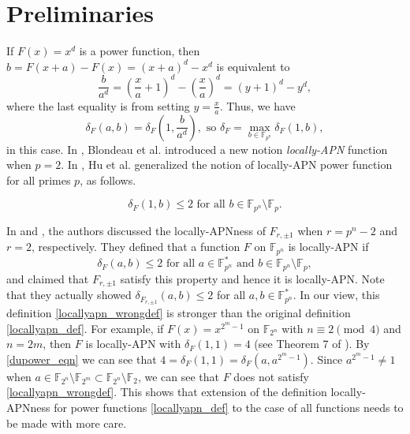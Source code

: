 \documentclass[11pt]{article}
\numberwithin{theorem}{section}
\newcommand{\Max}{\displaystyle \max}
\newcommand{\Frac}{\displaystyle \frac}
\newcommand{\F}{\mathbb F}
\newcommand{\Fbn}{\mathbb{F}_{2^n}}
\newcommand{\Fbm}{\mathbb{F}_{2^m}}
\newcommand{\Fp}{\mathbb{F}_{p}}
\newcommand{\Fpn}{\mathbb{F}_{p^n}}
\newcommand{\Fpnmul}{\mathbb{F}_{p^n}^*}
\begin{document}
\section{Preliminaries}\label{sec_pre}



If $F(x)=x^d$ is a power function, then $b=F(x+a)-F(x)=(x+a)^d-x^d$ is equivalent to
\begin{equation*}
	\Frac{b}{a^d}=\left(\Frac x a +1\right)^d -\left(\Frac x a\right)^d = (y+1)^d-y^d,
\end{equation*}
where the last equality is from setting $y=\Frac x a$. Thus, we have 
\begin{equation}\label{dupower_eqn}
	\delta_F(a,b)=\delta_F\left(1, \Frac{b}{a^d} \right), \text{ so }	\delta_F=\Max_{b\in \Fpn}\delta_F(1,b),
\end{equation}
in this case. In \cite{BCC11}, Blondeau et al. introduced a new notion \emph{locally-APN} function when $p=2$. In \cite{HLX+23}, Hu et al. generalized the notion of locally-APN power function for all primes $p$, as follows.
 
\begin{equation}\label{locallyapn_def}
	\delta_F(1,b)\le 2\text{ for all }b\in \Fpn\setminus\Fp.
\end{equation}


In \cite{LWZ24} and \cite{MW25}, the authors discussed the locally-APNness of $F_{r,\pm1}$ when $r=p^n-2$ and $r=2$, respectively. They defined that a function $F$ on $\Fpn$ is locally-APN if
\begin{equation}\label{locallyapn_wrongdef} 
	\delta_F(a,b)\le 2\text{ for all }a\in \Fpnmul\text{ and }b\in \Fpn\setminus \Fp,
\end{equation} 
and claimed that $F_{r,\pm1}$ satisfy this property and hence it is locally-APN. Note that they actually showed $\delta_{F_{r,\pm1}}(a,b)\le 2$ for all $a,b\in\Fpnmul$. In our view, this definition \eqref{locallyapn_wrongdef} is stronger than the original definition \eqref{locallyapn_def}. For example, if $F(x) = x^{2^m-1}$ on $\Fbn$ with $n\equiv2\pmod{4}$ and $n=2m$, then $F$ is locally-APN with $\delta_F(1,1)=4$ (see Theorem 7 of \cite{BCC11}). By \eqref{dupower_eqn} we can see that $4=\delta_F(1,1)=\delta_F(a,a^{2^m-1})$. Since $a^{2^m-1}\ne 1$ when $a\in \Fbn\setminus\Fbm\subset \Fbn\setminus \F_2$, we can see that $F$ does not satisfy \eqref{locallyapn_wrongdef}. This shows that extension of the definition locally-APNness for power functions \eqref{locallyapn_def} to the case of all functions needs to be made with more care. 
\end{document}
